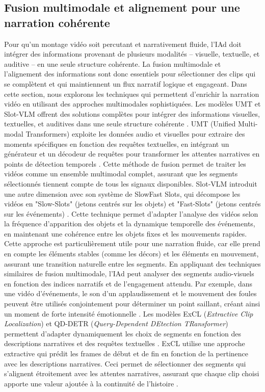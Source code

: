 \documentclass[livre]{udes-genie-these}
\begin{document}
\subsection{Fusion multimodale et alignement pour une narration cohérente}
Pour qu'un montage vidéo soit percutant et narrativement fluide, l'IAd doit intégrer des informations provenant de plusieurs modalités – visuelle, textuelle, et auditive – en une seule structure cohérente. La fusion multimodale et l'alignement des informations sont donc essentiels pour sélectionner des clips qui se complètent et qui maintiennent un flux narratif logique et engageant. Dans cette section, nous explorons les techniques qui permettent d'enrichir la narration vidéo en utilisant des approches multimodales sophistiquées.
Les modèles UMT et Slot-VLM offrent des solutions complètes pour intégrer des informations visuelles, textuelles, et auditives dans une seule structure cohérente \cite{liu2022_umt}\cite{xu2024}. UMT (Unified Multi-modal Transformers) exploite les données audio et visuelles pour extraire des moments spécifiques en fonction des requêtes textuelles, en intégrant un générateur et un décodeur de requêtes pour transformer les attentes narratives en points de détection temporels \cite{liu2022_umt}. Cette méthode de fusion permet de traiter les vidéos comme un ensemble multimodal complet, assurant que les segments sélectionnés tiennent compte de tous les signaux disponibles.
Slot-VLM introduit une autre dimension avec son système de SlowFast Slots, qui décompose les vidéos en "Slow-Slots" (jetons centrés sur les objets) et "Fast-Slots" (jetons centrés sur les événements) \cite{xu2024}. Cette technique permet d'adapter l'analyse des vidéos selon la fréquence d'apparition des objets et la dynamique temporelle des événements, en maintenant une cohérence entre les objets fixes et les mouvements rapides. Cette approche est particulièrement utile pour une narration fluide, car elle prend en compte les éléments stables (comme les décors) et les éléments en mouvement, assurant une transition naturelle entre les segments.
En appliquant des techniques similaires de fusion multimodale, l'IAd peut analyser des segments audio-visuels en fonction des indices narratifs et de l'engagement attendu. Par exemple, dans une vidéo d'événements, le son d'un applaudissement et le mouvement des foules peuvent être utilisés conjointement pour déterminer un point saillant, créant ainsi un moment de forte intensité émotionnelle \cite{xu2024}\cite{liu2022_umt}.
Les modèles ExCL (\textit{Extractive Clip Localization}) et QD-DETR (\textit{Query-Dependent DEtection TRansformer}) permettent d'adapter dynamiquement les choix de segments en fonction des descriptions narratives et des requêtes textuelles \cite{ghosh2019_excl}\cite{sun2023_gptsee}. ExCL utilise une approche extractive qui prédit les frames de début et de fin en fonction de la pertinence avec les descriptions narratives. Ceci permet de sélectionner des segments qui s'alignent étroitement avec les attentes narratives, assurant que chaque clip choisi apporte une valeur ajoutée à la continuité de l'histoire \cite{ghosh2019_excl}.
\end{document}
